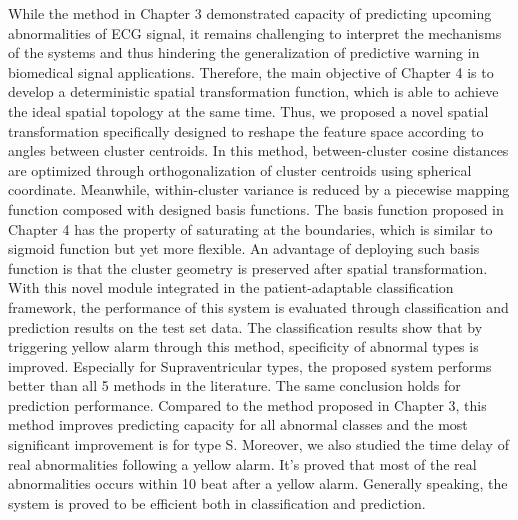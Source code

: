 While the method in Chapter 3 demonstrated capacity of predicting upcoming abnormalities of ECG signal, it remains challenging to interpret the mechanisms of the systems and thus hindering the generalization of predictive warning in biomedical signal applications. Therefore, the main objective of Chapter 4 is to develop a deterministic spatial transformation function, which is able to achieve the ideal spatial topology at the same time. Thus, we proposed a novel spatial transformation specifically designed to reshape the feature space according to angles between cluster centroids. In this method, between-cluster cosine distances are optimized through orthogonalization of cluster centroids using spherical coordinate. Meanwhile, within-cluster variance is reduced by a piecewise mapping function composed with designed basis functions. The basis function proposed in Chapter 4 has the property of saturating at the boundaries, which is similar to sigmoid function but yet more flexible. An advantage of deploying such basis function is that the cluster geometry is preserved after spatial transformation. 
With this novel module integrated in the patient-adaptable classification framework, the performance of this system is evaluated through classification and prediction results on the test set data. The classification results show that by triggering yellow alarm through this method, specificity of abnormal types is improved. Especially for Supraventricular types, the proposed system performs better than all 5 methods in the literature. The same conclusion holds for prediction performance. Compared to the method proposed in Chapter 3, this method improves predicting capacity for all abnormal classes and the most significant improvement is for type S. Moreover, we also studied the time delay of real abnormalities following a yellow alarm. It's proved that most of the real abnormalities occurs within 10 beat after a yellow alarm. Generally speaking, the system is proved to be efficient both in classification and prediction.



